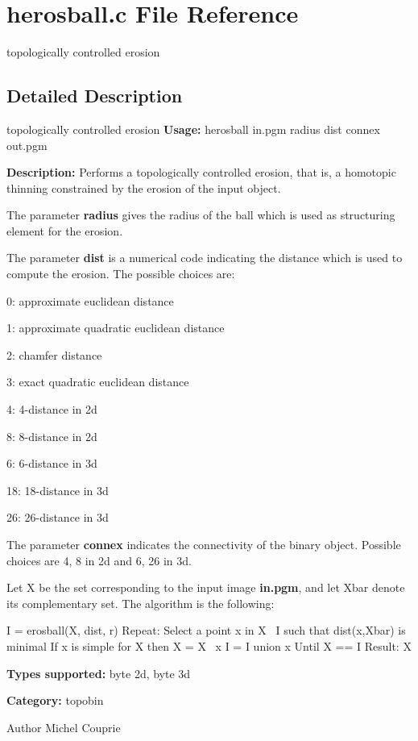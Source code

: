 \section{herosball.c File Reference}
\label{herosball_8c}


topologically controlled erosion  




\subsection{Detailed Description}
topologically controlled erosion {\bfseries Usage:} herosball in.pgm radius dist connex out.pgm

{\bfseries Description:} Performs a topologically controlled erosion, that is, a homotopic thinning constrained by the erosion of the input object.

The parameter {\bfseries radius} gives the radius of the ball which is used as structuring element for the erosion.

The parameter {\bfseries dist} is a numerical code indicating the distance which is used to compute the erosion. The possible choices are: \begin{DoxyItemize}
\item 0: approximate euclidean distance \item 1: approximate quadratic euclidean distance \item 2: chamfer distance \item 3: exact quadratic euclidean distance \item 4: 4-\/distance in 2d \item 8: 8-\/distance in 2d \item 6: 6-\/distance in 3d \item 18: 18-\/distance in 3d \item 26: 26-\/distance in 3d\end{DoxyItemize}
The parameter {\bfseries connex} indicates the connectivity of the binary object. Possible choices are 4, 8 in 2d and 6, 26 in 3d.

Let X be the set corresponding to the input image {\bfseries in.pgm}, and let Xbar denote its complementary set. The algorithm is the following:

\begin{DoxyVerb}
I = erosball(X, dist, r)
Repeat:
    Select a point x in X \ I such that dist(x,Xbar) is minimal
    If x is simple for X then
        X = X \ {x}
	I = I union {x}
Until X == I
Result: X
\end{DoxyVerb}


{\bfseries Types supported:} byte 2d, byte 3d

{\bfseries Category:} topobin

\begin{DoxyAuthor}{Author}
Michel Couprie 
\end{DoxyAuthor}
